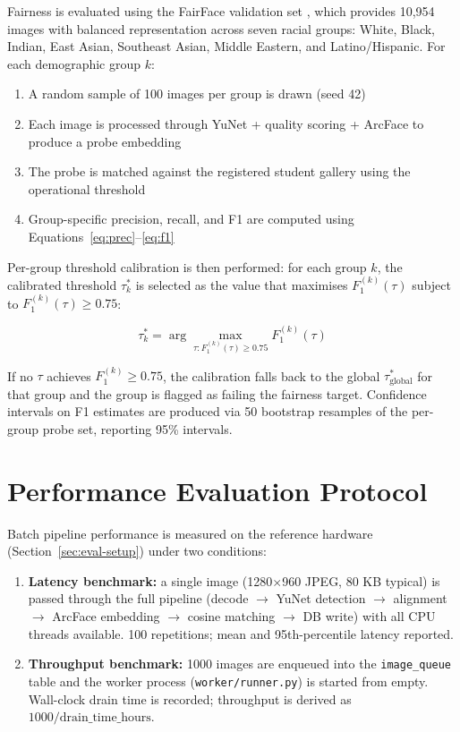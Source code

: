 \documentclass[12pt,a4paper]{report}
\begin{document}
Fairness is evaluated using the FairFace validation set \cite{karkkainen2021fairface}, which provides 10,954 images with balanced representation across seven racial groups: White, Black, Indian, East Asian, Southeast Asian, Middle Eastern, and Latino/Hispanic. For each demographic group $k$:

\begin{enumerate}
  \item A random sample of 100 images per group is drawn (seed 42)
  \item Each image is processed through YuNet + quality scoring + ArcFace to produce a probe embedding
  \item The probe is matched against the registered student gallery using the operational threshold
  \item Group-specific precision, recall, and F1 are computed using Equations~\ref{eq:prec}--\ref{eq:f1}
\end{enumerate}

Per-group threshold calibration is then performed: for each group $k$, the calibrated threshold $\tau^*_k$ is selected as the value that maximises $F_1^{(k)}(\tau)$ subject to $F_1^{(k)}(\tau) \geq 0.75$:

\begin{equation}
  \tau^*_k = \arg\max_{\tau : F_1^{(k)}(\tau) \geq 0.75} F_1^{(k)}(\tau)
\end{equation}

If no $\tau$ achieves $F_1^{(k)} \geq 0.75$, the calibration falls back to the global $\tau^*_{\text{global}}$ for that group and the group is flagged as failing the fairness target. Confidence intervals on F1 estimates are produced via 50 bootstrap resamples of the per-group probe set, reporting 95\% intervals.

\section{Performance Evaluation Protocol}
\label{sec:eval-performance}

Batch pipeline performance is measured on the reference hardware (Section~\ref{sec:eval-setup}) under two conditions:

\begin{enumerate}
  \item \textbf{Latency benchmark:} a single image (1280$\times$960 JPEG, 80 KB typical) is passed through the full pipeline (decode $\rightarrow$ YuNet detection $\rightarrow$ alignment $\rightarrow$ ArcFace embedding $\rightarrow$ cosine matching $\rightarrow$ DB write) with all CPU threads available. 100 repetitions; mean and 95th-percentile latency reported.
  \item \textbf{Throughput benchmark:} 1000 images are enqueued into the \texttt{image\_queue} table and the worker process (\texttt{worker/runner.py}) is started from empty. Wall-clock drain time is recorded; throughput is derived as $1000 / \text{drain\_time\_hours}$.
\end{enumerate}
\end{document}
